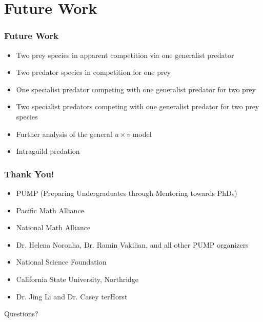 \documentclass[10pt]{beamer}
\begin{document}
\section{Future Work}
\begin{frame}
	\frametitle{Future Work}
	\begin{itemize}
		\item Two prey species in apparent competition via one generalist predator
		\item Two predator species in competition for one prey
		\item One specialist predator competing with one generalist predator for two prey
		\item Two specialist predators competing with one generalist predator for two prey species
		\item Further analysis of the general $u \times v$ model
		\item Intraguild predation
	\end{itemize}
\end{frame}

\begin{frame}
	\frametitle{Thank You!}
	\begin{itemize}
		\item PUMP (Preparing Undergraduates through Mentoring towards PhDs)
		\item Pacific Math Alliance
		\item National Math Alliance
		\item Dr. Helena Noronha, Dr. Ramin Vakilian, and all other PUMP organizers
		\item National Science Foundation
		\item California State University, Northridge
		\item Dr. Jing Li and Dr. Casey terHorst
	\end{itemize}
	\begin{center}
		{\Huge Questions?}
	\end{center}
\end{frame}
\end{document}

